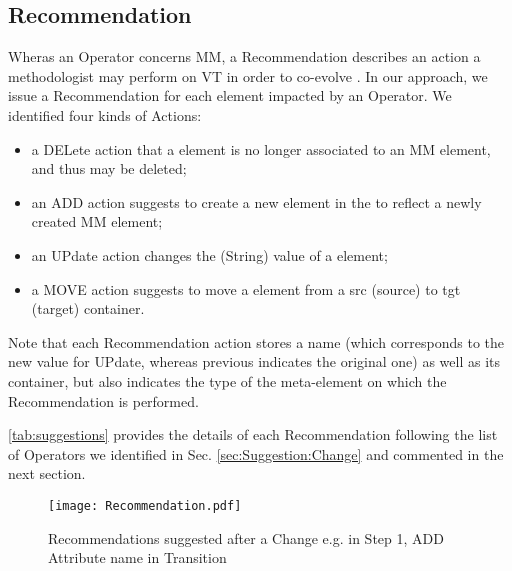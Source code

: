 \subsection{Recommendation}
\label{sec:Suggestion:Recommendation}

Wheras an \textsf{Operator} concerns \textsf{MM}, a \textsf{Recommendation} 
describes an action a methodologist may perform on \textsf{VT} in order to
co-evolve \viewtypes. 
In our approach, we issue a \textsf{Recommendation} for each \viewtype element 
impacted by an \textsf{Operator}. We identified four kinds of \textsf{Action}s: 
\begin{itemize}
	\item a \textsf{DEL}ete action that a \viewtype element is no longer associated
	to an \textsf{MM} element, and thus may be deleted;
	\item an \textsf{ADD} action suggests to create a new element in the \viewtype
	to reflect a newly created \textsf{MM} element;
	\item an \textsf{UP}date action changes the (String) value of a \viewtype element;
	\item a \textsf{MOVE} action suggests to move a \viewtype element from a \textsf{src}
	(source) to \textsf{tgt} (target) container.
\end{itemize}
Note that each \textsf{Recommendation} action stores a \textsf{name} (which corresponds
to the new value for \textsf{UP}date, whereas \textsf{previous} indicates the original
one) as well as its \textsf{container}, but also indicates the \textsf{type} of the
\viewtype meta-element on which the \textsf{Recommendation} is performed.

\autoref{tab:suggestions} provides the details of each \textsf{Recommendation} 
following the list of \textsf{Operator}s we identified in Sec. 
\ref{sec:Suggestion:Change} and commented in the next section.

\begin{figure}[t]
    \centering
    \texttt{[image: Recommendation.pdf]}
    \caption{\textsf{Recommendation}s suggested after a \textsf{Change}
    e.g. in Step 1, \textsf{ADD} Attribute \textsf{name} in \textsf{Transition}}
    \label{fig:Recommendation}
\end{figure}